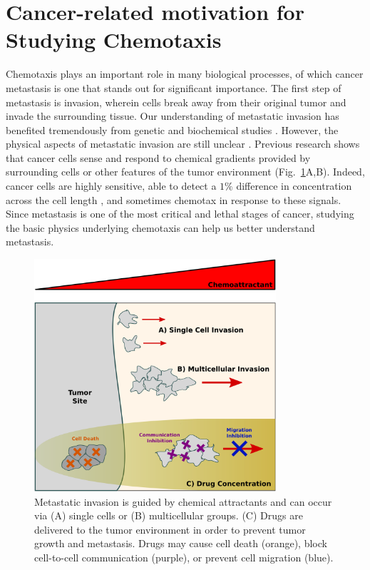 \section{Cancer-related motivation for Studying Chemotaxis}

Chemotaxis plays an important role in many biological processes, of which cancer metastasis is one that stands out for significant importance. The first step of metastasis is invasion, wherein cells break away from their original tumor and invade the surrounding tissue. Our understanding of metastatic invasion has benefited tremendously from genetic and biochemical studies \cite{leber2009molecular, hanahan2000hallmarks, hanahan2011hallmarks}. However, the physical aspects of metastatic invasion are still unclear \cite{hanahan2011hallmarks}. Previous research shows that cancer cells sense and respond to chemical gradients provided by surrounding cells
\cite{bhowmick2004stromal, condeelis2006macrophages, shields2007autologous, puliafito2015three} or other features of the tumor environment
\cite{shields2007autologous, polacheck2011interstitial, shieh2011regulation} (Fig.\ \ref{fig:ch1_1}A,B). Indeed, cancer cells are highly sensitive, able to detect a $1\%$ difference in concentration across the cell length
\cite{shields2007autologous}, and sometimes chemotax in response to these signals. Since metastasis is one of the most critical and lethal stages of cancer, studying the basic physics underlying chemotaxis can help us better understand metastasis.

\begin{figure}[ht]
    \centering
        \includegraphics[width=0.8\textwidth]{../fig/ch1_fig1.pdf}
    \caption{Metastatic invasion is guided by chemical attractants and can occur via (A) single cells or (B) multicellular groups. (C) Drugs are delivered to the tumor environment in order to prevent tumor growth and metastasis. Drugs may cause cell death (orange), block cell-to-cell communication (purple), or prevent cell migration (blue).}
\label{fig:ch1_1}
\end{figure}

